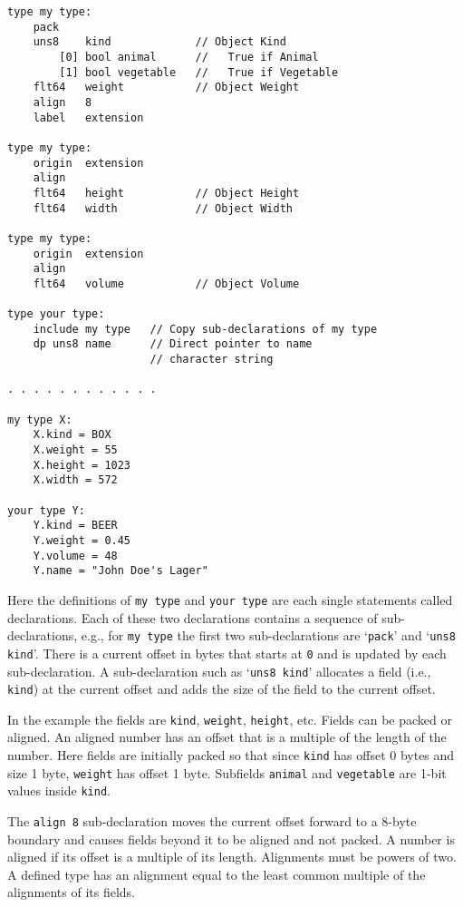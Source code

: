 \documentclass[12pt]{article}
\newenvironment{indpar}[1][0.3in]%
	{\begin{list}{}%
		     {\setlength{\itemsep}{0in}%
		      \setlength{\topsep}{0in}%
		      \setlength{\parsep}{1ex}%
		      \setlength{\labelwidth}{#1}%
		      \setlength{\leftmargin}{#1}%
		      \addtolength{\leftmargin}{\labelsep}}%
	 \item}%
	{\end{list}}
\begin{document}
\begin{indpar}\begin{verbatim}
type my type:
    pack
    uns8    kind             // Object Kind
        [0] bool animal      //   True if Animal
        [1] bool vegetable   //   True if Vegetable
    flt64   weight           // Object Weight
    align   8
    label   extension

type my type:
    origin  extension
    align
    flt64   height           // Object Height
    flt64   width            // Object Width

type my type:
    origin  extension
    align
    flt64   volume           // Object Volume

type your type:
    include my type   // Copy sub-declarations of my type
    dp uns8 name      // Direct pointer to name
                      // character string

. . . . . . . . . . . .

my type X:
    X.kind = BOX
    X.weight = 55
    X.height = 1023
    X.width = 572

your type Y:
    Y.kind = BEER
    Y.weight = 0.45
    Y.volume = 48
    Y.name = "John Doe's Lager"
\end{verbatim}\end{indpar}

Here the definitions of {\tt my type} and {\tt your type} are each
single statements called declarations.  Each of these two
declarations contains a sequence of sub-declarations, e.g.,
for {\tt my type} the first two sub-declarations are
`{\tt pack}' and `{\tt uns8 kind}'.  There is a current
offset in bytes that starts at {\tt 0} and is updated by each sub-declaration.
A sub-declaration such as `{\tt uns8 kind}' allocates a field
(i.e., {\tt kind})
at the current offset and adds the size of the field to the
current offset.

In the example the fields are {\tt kind}, {\tt weight}, {\tt height}, etc.
Fields can be packed or aligned.  An aligned number has an offset
that is a multiple of the length of the number.
Here fields are initially packed
so that since {\tt kind} has offset 0 bytes and size 1 byte,
{\tt weight} has offset 1 byte.  Subfields {\tt animal}
and {\tt vegetable} are 1-bit values inside {\tt kind}.

The {\tt align 8} sub-declaration moves the current offset
forward to a 8-byte boundary and causes fields beyond it
to be aligned and not packed.  A number is aligned if
its offset is a multiple of its length.  Alignments must be powers of two.
A defined type has an
alignment equal to the least common multiple of the
alignments of its fields.
\end{document}

